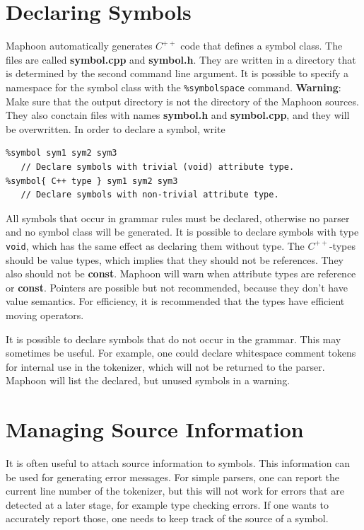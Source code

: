 \documentclass{article}
\begin{document}
\section{Declaring Symbols}

Maphoon automatically generates $ C^{++} $ code that defines
a symbol class.
The files are called {\bf symbol.cpp} and {\bf symbol.h}.
They are written in a directory that is determined by the second command
line argument. It is possible to specify a namespace for the
symbol class with the \verb+%symbolspace+ command. 
{\bf Warning}: Make sure that the output directory is not the
directory of the Maphoon sources. 
They also conctain files with names
{\bf symbol.h} and {\bf symbol.cpp},
and they will be overwritten.
In order to declare a symbol, write
\begin{verbatim}
%symbol sym1 sym2 sym3  
   // Declare symbols with trivial (void) attribute type.
%symbol{ C++ type } sym1 sym2 sym3 
   // Declare symbols with non-trivial attribute type. 
\end{verbatim} 
All symbols that occur in grammar rules must be
declared, otherwise no parser and no symbol class will be generated.
It is possible to declare symbols with type \verb+void+,
which has the same effect as declaring them without type.
The $C^{++} $-types should be value types, which implies that they should
not be references. 
They also should not be
{\bf const}. Maphoon will warn when attribute types 
are reference or {\bf const}.
Pointers are possible but not recommended, because they
don't have value semantics. 
For efficiency, it is recommended that the
types have efficient moving operators. 

It is possible to declare symbols that do not occur
in the grammar. This may sometimes be useful.
For example, one could declare whitespace 
comment tokens for internal use in the tokenizer,
which will not be returned to the parser.
Maphoon will list the declared, but unused symbols in a warning.

\section{Managing Source Information}

It is often useful to attach source information to symbols.
This information can be used for generating error messages. 
For simple parsers, one can report the current line number of
the tokenizer, but this will not work for errors that are detected
at a later stage, for example type checking errors. If one wants to 
accurately report those, one needs to keep track of 
the source of a symbol. 
\end{document}
